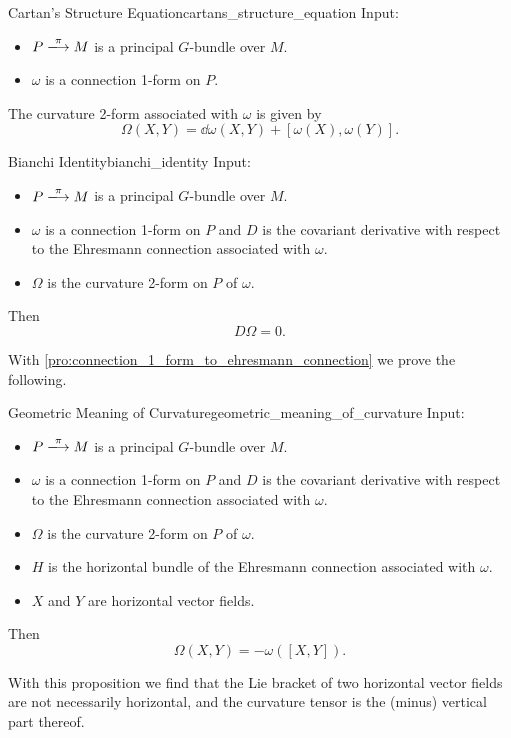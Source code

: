 \documentclass{article}
\begin{document}
\begin{theorem}{Cartan's Structure Equation}{cartans_structure_equation}
    Input:
    \begin{itemize}
        \item $P\xlongrightarrow{\pi} M$ is a principal $G$-bundle over $M$.
        \item $\omega$ is a connection 1-form on $P$.
    \end{itemize}
    The curvature 2-form associated with $\omega$ is given by
    \[ \Omega(X, Y) = \dd{\omega}(X, Y) + [\omega(X), \omega(Y)]. \]
\end{theorem}

\begin{theorem}{Bianchi Identity}{bianchi_identity}
    Input:
    \begin{itemize}
        \item $P\xlongrightarrow{\pi} M$ is a principal $G$-bundle over $M$.
        \item $\omega$ is a connection 1-form on $P$ and $D$ is the covariant derivative with respect to the Ehresmann connection associated with $\omega$.
        \item $\Omega$ is the curvature 2-form on $P$ of $\omega$.
    \end{itemize}
    Then
    \[ D\Omega = 0. \]
\end{theorem}

With \cref{pro:connection_1_form_to_ehresmann_connection} we prove the following.
\begin{proposition}{Geometric Meaning of Curvature}{geometric_meaning_of_curvature}
    Input:
    \begin{itemize}
        \item $P\xlongrightarrow{\pi} M$ is a principal $G$-bundle over $M$.
        \item $\omega$ is a connection 1-form on $P$ and $D$ is the covariant derivative with respect to the Ehresmann connection associated with $\omega$.
        \item $\Omega$ is the curvature 2-form on $P$ of $\omega$.
        \item $H$ is the horizontal bundle of the Ehresmann connection associated with $\omega$.
        \item $X$ and $Y$ are horizontal vector fields.
    \end{itemize}
    Then
    \[ \Omega(X, Y) = -\omega([X, Y]). \]
\end{proposition}
With this proposition we find that the Lie bracket of two horizontal vector fields are not necessarily horizontal, and the curvature tensor is the (minus) vertical part thereof.
\end{document}
